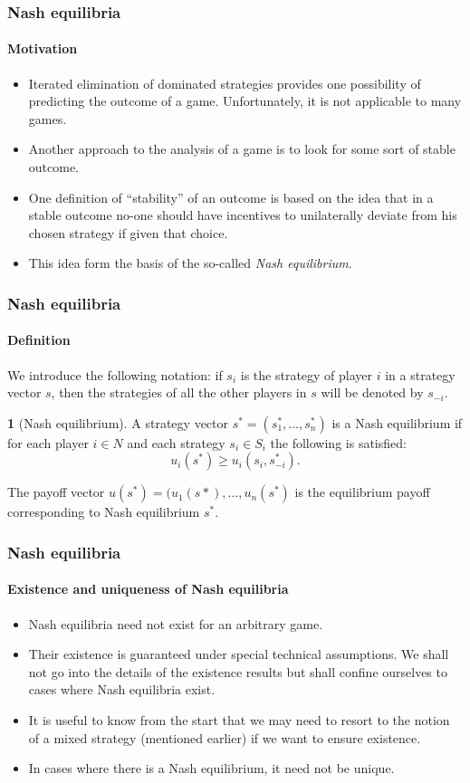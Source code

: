 \documentclass[10pt]{beamer}
\theoremstyle{definition}
\newtheorem{definition}{\translate{Definition}}
\begin{document}
\begin{frame}[fragile]
\frametitle{Nash equilibria}
\framesubtitle{Motivation}
\begin{itemize}\itemsep1em
\item Iterated elimination of dominated strategies provides one possibility of predicting the outcome of a game. Unfortunately, it is not applicable to many games.
\item Another approach to the analysis of a game is to look for some sort of stable outcome.
\item One definition of ``stability'' of an outcome is based on the idea that in a stable outcome no-one should have incentives to unilaterally deviate from his chosen strategy if given that choice.
\item This idea form the basis of the so-called \emph{Nash equilibrium}.
\end{itemize}
\end{frame}



\begin{frame}[fragile]
\frametitle{Nash equilibria}
\framesubtitle{Definition}
We introduce the following notation: if $ s_i $ is the strategy of player $ i $ in a strategy vector $ s $, then the strategies of all the other players in $ s $ will be denoted by $ s_{-i} $.\bigskip

\begin{definition}[Nash equilibrium]\label{def:NashEq}
A strategy vector $ s^* = (s_1^*,\ldots,s_n^*) $ is a Nash equilibrium if for each player $ i \in N $ and each strategy $ s_i \in S_i $ the following is satisfied:
\begin{equation}
u_i(s^*)\geq u_i(s_i,s^*_{-i}).
\label{eq:NE}
\end{equation}

The payoff vector $ u(s^*) = (u_1(s*),\ldots,u_n(s^*) $ is the equilibrium payoff corresponding to Nash equilibrium $ s^* $.
\end{definition}
\end{frame}



\begin{frame}[fragile]
\frametitle{Nash equilibria}
\framesubtitle{Existence and uniqueness of Nash equilibria}
\begin{itemize}\itemsep1em
\item Nash equilibria need not exist for an arbitrary game.
\item Their existence is guaranteed under special technical assumptions. We shall not go into the details of the existence results but shall confine ourselves to cases where Nash equilibria exist.
\item It is useful to know from the start that we may need to resort to the notion of a mixed strategy (mentioned earlier) if we want to ensure existence.
\item In cases where there is a Nash equilibrium, it need not be unique.
\end{itemize}
\end{frame}
\end{document}

